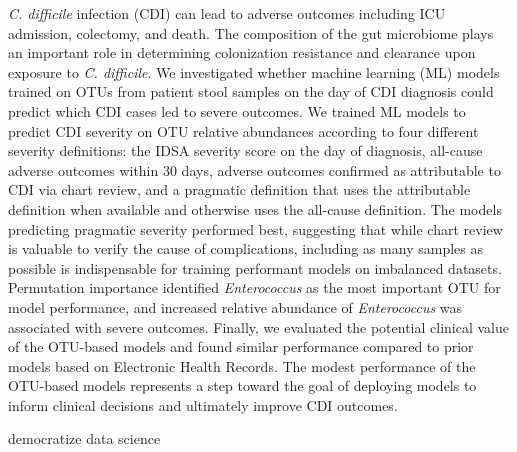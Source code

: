 \textit{C. difficile} infection (CDI) can lead to adverse outcomes
including ICU admission, colectomy, and death. The composition of the
gut microbiome plays an important role in determining colonization
resistance and clearance upon exposure to \textit{C. difficile}.
We investigated whether machine learning (ML) models trained on OTUs from patient
stool samples on the day of CDI diagnosis could predict which CDI cases
led to severe outcomes.
We trained ML models to predict CDI
severity on OTU relative abundances according to four different severity
definitions: the IDSA severity score on the day of diagnosis, all-cause
adverse outcomes within 30 days, adverse outcomes confirmed as
attributable to CDI via chart review, and a pragmatic definition that
uses the attributable definition when available and otherwise uses the
all-cause definition.
The models predicting pragmatic severity performed
best, suggesting that while chart review is valuable to verify the cause
of complications, including as many samples as possible is indispensable
for training performant models on imbalanced datasets.
Permutation
importance identified \textit{Enterococcus} as the most important OTU for model
performance, and increased relative abundance of \textit{Enterococcus} was
associated with severe outcomes.
Finally, we evaluated the potential
clinical value of the OTU-based models and found similar performance
compared to prior models based on Electronic Health Records.
The modest
performance of the OTU-based models represents a step toward the goal of
deploying models to inform clinical decisions and ultimately improve CDI
outcomes.

democratize data science